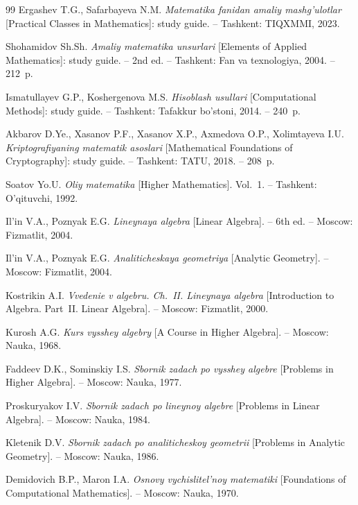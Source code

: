 \begin{thebibliography}{99}
Ergashev T.G., Safarbayeva N.M. \textit{Matematika fanidan amaliy
mashg’ulotlar} [Practical Classes in Mathematics]: study guide. –
Tashkent: TIQXMMI, 2023.

Shohamidov Sh.Sh. \textit{Amaliy matematika unsurlari} [Elements of Applied
Mathematics]: study guide. – 2nd ed. – Tashkent: Fan va texnologiya, 2004. –
212~p.

Ismatullayev G.P., Koshergenova M.S. \textit{Hisoblash usullari}
[Computational Methods]: study guide. – Tashkent: Tafakkur bo’stoni, 2014. –
240~p.

Akbarov D.Ye., Xasanov P.F., Xasanov X.P., Axmedova O.P., Xolimtayeva I.U.
\textit{Kriptografiyaning matematik asoslari} [Mathematical Foundations of
Cryptography]: study guide. – Tashkent: TATU, 2018. – 208~p.

Soatov Yo.U. \textit{Oliy matematika} [Higher Mathematics]. Vol.~1. –
Tashkent: O’qituvchi, 1992.

Il’in V.A., Poznyak E.G. \textit{Lineynaya algebra} [Linear Algebra]. –
6th ed. – Moscow: Fizmatlit, 2004.

Il’in V.A., Poznyak E.G. \textit{Analiticheskaya geometriya} [Analytic
Geometry]. – Moscow: Fizmatlit, 2004.

Kostrikin A.I. \textit{Vvedenie v algebru. Ch.~II. Lineynaya algebra}
[Introduction to Algebra. Part~II. Linear Algebra]. – Moscow: Fizmatlit,
2000.

Kurosh A.G. \textit{Kurs vysshey algebry} [A Course in Higher Algebra]. –
Moscow: Nauka, 1968.

Faddeev D.K., Sominskiy I.S. \textit{Sbornik zadach po vysshey algebre}
[Problems in Higher Algebra]. – Moscow: Nauka, 1977.

Proskuryakov I.V. \textit{Sbornik zadach po lineynoy algebre} [Problems in
Linear Algebra]. – Moscow: Nauka, 1984.

Kletenik D.V. \textit{Sbornik zadach po analiticheskoy geometrii} [Problems
in Analytic Geometry]. – Moscow: Nauka, 1986.

Demidovich B.P., Maron I.A. \textit{Osnovy vychislitel’noy matematiki}
[Foundations of Computational Mathematics]. – Moscow: Nauka, 1970.



\end{thebibliography}
